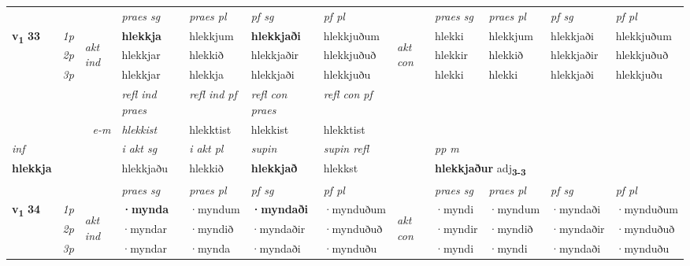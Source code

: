 \begin{longtable}[l]{X>{\footnotesize\itshape}llXXXXlXXXX}
 & &   & \textit{praes sg}  & \textit{praes pl}    & \textit{ pf sg} & \textit{pf pl} & & \textit{praes sg}  & \textit{praes pl}    & \textit{pf sg} & \textit{pf pl }  \\ \cmidrule{4-7} \cmidrule{9-12}
 \multirow{2}{*}{{{\textbf{v{\textsubscript{1}}} \Large{\textbf{33}}}}}  & 1p & \multirow{3}{*}{\begin{turn}{90}\textit{akt ind}\end{turn}} & \textbf{hlekkja} & hlekkjum & \textbf{hlekkjaði} & hlekkjuðum & \multirow{3}{*}{\begin{turn}{90}\textit{akt con}\end{turn}} &hlekki & hlekkjum & hlekkjaði & hlekkjuðum\\*
 & 2p &  &  hlekkjar  & hlekkið & hlekkjaðir & hlekkjuðuð & & hlekkir & hlekkið & hlekkjaðir & hlekkjuðuð \\*
 & 3p &  & hlekkjar & hlekkja & hlekkjaði & hlekkjuðu & & hlekki & hlekki& hlekkjaði & hlekkjuðu \\*
\cmidrule{4-7} \cmidrule{9-12}

 & && \textit{refl ind praes} & \textit{refl ind pf} & \textit{refl con praes} & \textit{refl con pf} \\*
\multicolumn{3}{r}{\textit{e-m}}& hlekkist & hlekktist & hlekkist & hlekktist \\*

\cmidrule{4-7}
   {\textit{inf}} & &  & \textit{i akt sg} & \textit{i akt pl}    & \textit{supin} & \textit{supin refl} && \textit{pp m} \\*
  {\textbf{hlekkja}} & && hlekkjaðu  & hlekkið    &  \textbf{hlekkjað} & hlekkst && \multicolumn{2}{l}{\textbf{hlekkjaður} adj\textbf{\textsubscript{3-3}}} \\*

\midrule

 & &   & \textit{praes sg}  & \textit{praes pl}    & \textit{ pf sg} & \textit{pf pl} & & \textit{praes sg}  & \textit{praes pl}    & \textit{pf sg} & \textit{pf pl }  \\ \cmidrule{4-7} \cmidrule{9-12}
 \multirow{2}{*}{{{\textbf{v{\textsubscript{1}}} \Large{\textbf{34}}}}}  & 1p & \multirow{3}{*}{\begin{turn}{90}\textit{akt ind}\end{turn}} & \textbf{·mynda} & ·myndum & \textbf{·myndaði} & ·mynduðum & \multirow{3}{*}{\begin{turn}{90}\textit{akt con}\end{turn}} &·myndi & ·myndum & ·myndaði & ·mynduðum\\*
 & 2p &  &  ·myndar  & ·myndið & ·myndaðir & ·mynduðuð & & ·myndir & ·myndið & ·myndaðir & ·mynduðuð \\*
 & 3p &  & ·myndar & ·mynda & ·myndaði & ·mynduðu & & ·myndi & ·myndi& ·myndaði & ·mynduðu \\*
\cmidrule{4-7} \cmidrule{9-12}


\end{longtable}
